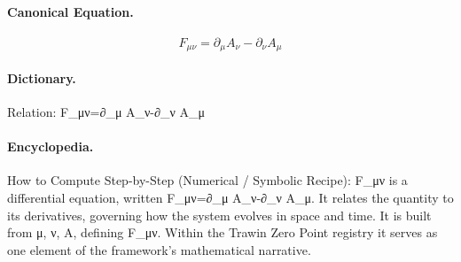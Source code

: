 \paragraph{Canonical Equation.}
\[
F_{\mu\nu}=\partial_\mu A_\nu-\partial_\nu A_\mu
\]

\paragraph{Dictionary.}
Relation: F\_μν=∂\_μ A\_ν-∂\_ν A\_μ

\paragraph{Encyclopedia.}
How to Compute Step-by-Step (Numerical / Symbolic Recipe): F\_μν is a differential equation, written F\_μν=∂\_μ A\_ν-∂\_ν A\_μ. It relates the quantity to its derivatives, governing how the system evolves in space and time. It is built from μ, ν, A, defining F\_μν. Within the Trawin Zero Point registry it serves as one element of the framework's mathematical narrative.
